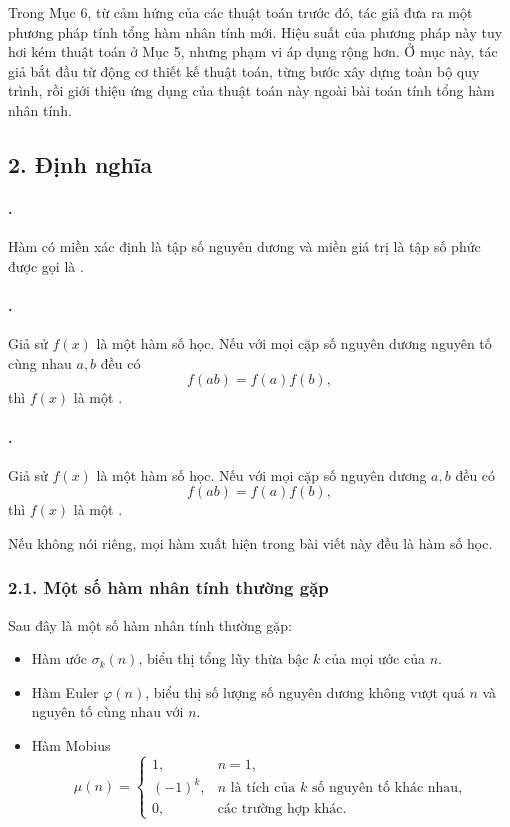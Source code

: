 \documentclass[11pt]{article}
\begin{document}
Trong Mục 6, từ cảm hứng của các thuật toán trước đó, tác giả đưa ra một
phương pháp tính tổng hàm nhân tính mới. Hiệu suất của phương pháp này tuy hơi
kém thuật toán ở Mục 5, nhưng phạm vi áp dụng rộng hơn. Ở mục này, tác giả bắt
đầu từ động cơ thiết kế thuật toán, từng bước xây dựng toàn bộ quy trình, rồi
giới thiệu ứng dụng của thuật toán này ngoài bài toán tính tổng hàm nhân tính.

\subsection*{2. Định nghĩa}

\paragraph{.}
Hàm có miền xác định là tập số nguyên dương và miền giá trị là tập số phức
được gọi là .

\paragraph{.}
Giả sử \(f(x)\) là một hàm số học. Nếu với mọi cặp số nguyên dương nguyên tố
cùng nhau \(a,b\) đều có
\[
  f(ab)=f(a)f(b),
\]
thì \(f(x)\) là một .

\paragraph{.}
Giả sử \(f(x)\) là một hàm số học. Nếu với mọi cặp số nguyên dương \(a,b\) đều
có
\[
  f(ab)=f(a)f(b),
\]
thì \(f(x)\) là một .

Nếu không nói riêng, mọi hàm xuất hiện trong bài viết này đều là hàm số học.

\subsubsection*{2.1. Một số hàm nhân tính thường gặp}

Sau đây là một số hàm nhân tính thường gặp:
\begin{itemize}
  \item Hàm ước \(\sigma_k(n)\), biểu thị tổng lũy thừa bậc \(k\) của mọi ước
  của \(n\).
  \item Hàm Euler \(\varphi(n)\), biểu thị số lượng số nguyên dương không vượt
  quá \(n\) và nguyên tố cùng nhau với \(n\).
  \item Hàm Mobius
  \[
    \mu(n)=
    \begin{cases}
      1, & n=1,\\
      (-1)^k, & n\text{ là tích của }k\text{ số nguyên tố khác nhau},\\
      0, & \text{các trường hợp khác}.
    \end{cases}
  \]
\end{itemize}
\end{document}
